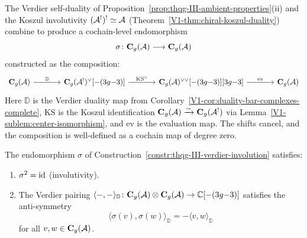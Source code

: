 \begin{construction}
\label{constr:thqg-III-verdier-involution}
The Verdier self-duality of
Proposition~\ref{prop:thqg-III-ambient-properties}(ii) and
the Koszul involutivity
$(\mathcal{A}^!)^! \simeq \mathcal{A}$
(Theorem~\ref{V1-thm:chiral-koszul-duality}) combine to produce
a cochain-level endomorphism
\begin{equation}%
\sigma
\colon
\mathbf{C}_g(\cA) \longrightarrow \mathbf{C}_g(\cA)
\end{equation}
constructed as the composition:
\begin{equation}%
\begin{tikzcd}[column sep=large]
\mathbf{C}_g(\cA)
\arrow[r, "\mathbb{D}"]
&
\mathbf{C}_g(\cA^!)^{\vee}[{-(3g{-}3)}]
\arrow[r, "\mathrm{KS}^{\vee}"]
&
\mathbf{C}_g(\cA)^{\vee\vee}[{-(3g{-}3)}][{3g{-}3}]
\arrow[r, "\mathrm{ev}"]
&
\mathbf{C}_g(\cA)
\end{tikzcd}
\end{equation}
Here $\mathbb{D}$ is the Verdier duality map from
Corollary~\ref{V1-cor:duality-bar-complexes-complete},
$\mathrm{KS}$ is the Koszul identification
$\mathbf{C}_g(\mathcal{A}) \xrightarrow{\sim} \mathbf{C}_g(\mathcal{A}^!)$
via Lemma~\ref{V1-sublem:center-isomorphism}, and $\mathrm{ev}$
is the evaluation map. The shifts cancel, and the composition
is well-defined as a cochain map of degree zero.
\end{construction}

\begin{proposition}
\label{prop:thqg-III-involutivity}
The endomorphism $\sigma$ of
Construction~\textup{\ref{constr:thqg-III-verdier-involution}}
satisfies:
\begin{enumerate}[label=\textup{(\alph*)}]
\item $\sigma^2 = \mathrm{id}$ \textup{(}involutivity\textup{)}.
\item The Verdier pairing
 $\langle -, - \rangle_{\mathbb{D}} \colon
 \mathbf{C}_g(\mathcal{A}) \otimes \mathbf{C}_g(\mathcal{A}) \to
 \mathbb{C}[{-(3g{-}3)}]$
 satisfies the anti-symmetry
 \begin{equation}%
 \langle \sigma(v), \sigma(w) \rangle_{\mathbb{D}}
 = -\langle v, w \rangle_{\mathbb{D}}
 \end{equation}
 for all $v, w \in \mathbf{C}_g(\mathcal{A})$.
\end{enumerate}
\end{proposition}

